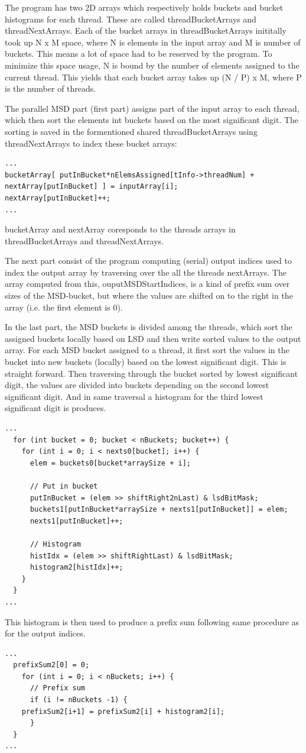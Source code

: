 The program has two 2D arrays which respectively holds buckets and bucket histograms for each thread. These are called threadBucketArrays and threadNextArrays.
Each of the bucket arrays in threadBucketArrays inititally took up N x M space, where N is elements in the input array and M is number of buckets.
This means a lot of space had to be reserved by the program. To minimize this space usage, N is bound by the number of elements assigned to the current thread.
This yields that each bucket array takes up (N / P) x M, where P is the number of threads. 

The parallel MSD part (first part) assigns part of the input array to each thread, which then sort the elements int buckets based on the most significant digit.
The sorting is saved in the formentioned shared threadBucketArrays using threadNextArrays to index these bucket arrays:
\begin{lstlisting}
...
bucketArray[ putInBucket*nElemsAssigned[tInfo->threadNum] + nextArray[putInBucket] ] = inputArray[i];
nextArray[putInBucket]++; 
... 
\end{lstlisting}
bucketArray and nextArray coresponds to the threads arrays in threadBucketArrays and threadNextArrays.

The next part consist of the program computing (serial) output indices used to index the output array by traversing over the all the threads nextArrays.   
The array computed from this, ouputMSDStartIndices, is a kind of prefix sum over sizes of the MSD-bucket, but where the values are shifted on to the right in the array (i.e. the first element is 0).

In the last part, the MSD buckets is divided among the threads, which sort the assigned buckets locally based on LSD and then write sorted values to the output array.
For each MSD bucket assigned to a thread, it first sort the values in the bucket into new buckets (locally) based on the lowest significant digit. This is straight forward.
Then traversing through the bucket sorted by lowest significant digit, the values are divided into buckets depending on the second lowest significant digit.
And in same traversal a histogram for the third lowest significant digit is produces.
\begin{lstlisting}
...
  for (int bucket = 0; bucket < nBuckets; bucket++) {
    for (int i = 0; i < nexts0[bucket]; i++) {
      elem = buckets0[bucket*arraySize + i];

      // Put in bucket
      putInBucket = (elem >> shiftRight2nLast) & lsdBitMask;
      buckets1[putInBucket*arraySize + nexts1[putInBucket]] = elem;
      nexts1[putInBucket]++;

      // Histogram
      histIdx = (elem >> shiftRightLast) & lsdBitMask;
      histogram2[histIdx]++;
    }
  }
...
\end{lstlisting}
This histogram is then used to produce a prefix sum following same procedure as for the output indices.
\begin{lstlisting}
... 
  prefixSum2[0] = 0;
    for (int i = 0; i < nBuckets; i++) {
      // Prefix sum
      if (i != nBuckets -1) {
	prefixSum2[i+1] = prefixSum2[i] + histogram2[i];
      } 
  }
...
\end{lstlisting}

